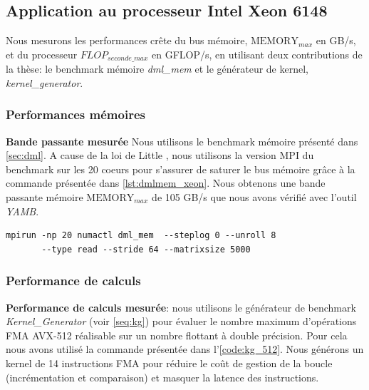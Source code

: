 \subsection{Application au processeur Intel Xeon 6148}
Nous mesurons les performances crête du bus mémoire, $\text{MEMORY}_{max}$ en GB/s, et du processeur $FLOP_{seconde\_max}$ en GFLOP/s, en utilisant deux contributions de la thèse: le benchmark mémoire \textit{dml\_mem} et le générateur de kernel, \textit{kernel\_generator}.


\subsubsection{Performances mémoires}


\textbf{Bande passante mesurée}
Nous utilisons le benchmark mémoire présenté dans \autoref{sec:dml}. A cause de la loi de Little \cite{little2008little}, nous utilisons la version MPI du benchmark sur les 20 coeurs pour s'assurer de saturer le bus mémoire grâce à la commande présentée dans \autoref{lst:dmlmem_xeon}. Nous obtenons une bande passante mémoire $\text{MEMORY}_{max}$ de 105 GB/s que nous avons vérifié avec l'outil \textit{YAMB}.\\

\begin{lstlisting}[caption=Commande utilisée pour obtenir la bande passante maximale avec le benchmark \textit{DML\_MEM}, label={lst:dmlmem_xeon},
  basicstyle=\footnotesize, frame=tb,
  xleftmargin=.065\textwidth, xrightmargin=.065\textwidth]
mpirun -np 20 numactl dml_mem  --steplog 0 --unroll 8 
       --type read --stride 64 --matrixsize 5000
\end{lstlisting}


\subsubsection{Performance de calculs}


\textbf{Performance de calculs mesurée}: nous utilisons le générateur de benchmark \textit{Kernel\_Generator} (voir \autoref{seq:kg}) pour évaluer le nombre maximum d'opérations FMA AVX-512 réalisable sur un nombre flottant à double précision. Pour cela nous avons utilisé la commande présentée dans l'\autoref{code:kg_512}. Nous générons un kernel de 14 instructions FMA pour réduire le coût de gestion de la boucle (incrémentation et comparaison) et masquer la latence des instructions.\\

